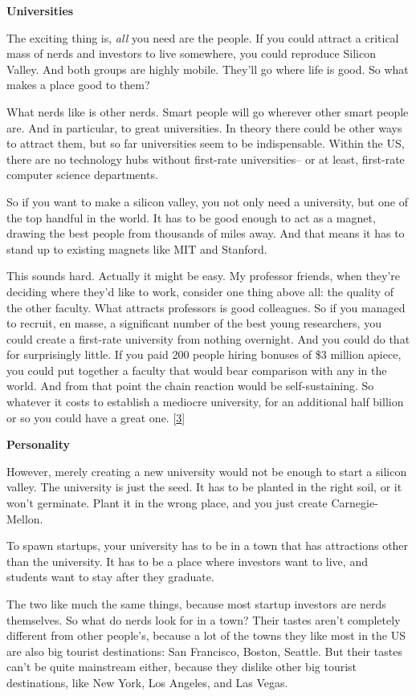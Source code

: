 \textbf{Universities}

The exciting thing is, \emph{all} you need are the people. If you could
attract a critical mass of nerds and investors to live somewhere, you
could reproduce Silicon Valley. And both groups are highly mobile.
They'll go where life is good. So what makes a place good to them?

What nerds like is other nerds. Smart people will go wherever other
smart people are. And in particular, to great universities. In theory
there could be other ways to attract them, but so far universities seem
to be indispensable. Within the US, there are no technology hubs without
first-rate universities-- or at least, first-rate computer science
departments.

So if you want to make a silicon valley, you not only need a university,
but one of the top handful in the world. It has to be good enough to act
as a magnet, drawing the best people from thousands of miles away. And
that means it has to stand up to existing magnets like MIT and Stanford.

This sounds hard. Actually it might be easy. My professor friends, when
they're deciding where they'd like to work, consider one thing above
all: the quality of the other faculty. What attracts professors is good
colleagues. So if you managed to recruit, en masse, a significant number
of the best young researchers, you could create a first-rate university
from nothing overnight. And you could do that for surprisingly little.
If you paid 200 people hiring bonuses of \$3 million apiece, you could
put together a faculty that would bear comparison with any in the world.
And from that point the chain reaction would be self-sustaining. So
whatever it costs to establish a mediocre university, for an additional
half billion or so you could have a great one. {[}\hyperref[f3n]{3}{]}

\textbf{Personality}

However, merely creating a new university would not be enough to start a
silicon valley. The university is just the seed. It has to be planted in
the right soil, or it won't germinate. Plant it in the wrong place, and
you just create Carnegie-Mellon.

To spawn startups, your university has to be in a town that has
attractions other than the university. It has to be a place where
investors want to live, and students want to stay after they graduate.

The two like much the same things, because most startup investors are
nerds themselves. So what do nerds look for in a town? Their tastes
aren't completely different from other people's, because a lot of the
towns they like most in the US are also big tourist destinations: San
Francisco, Boston, Seattle. But their tastes can't be quite mainstream
either, because they dislike other big tourist destinations, like New
York, Los Angeles, and Las Vegas.

